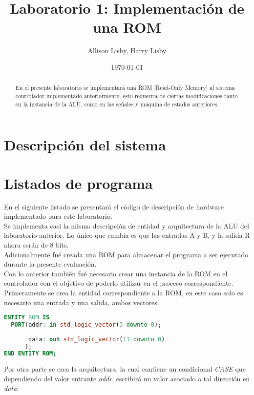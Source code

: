 \documentclass[12pt, letterpaper]{IEEEtran}
\title{Laboratorio 1: Implementación de una ROM}
\author{Allison Lisby, Harry Lisby}
\date{\today}
\begin{document}
\maketitle
\begin{abstract}
En el presente laboratorio se implementará una ROM [Read-Only Memory] al sistema controlador implementado anteriormente, esto requerirá de ciertas modificaciones tanto en la instancia de la ALU, como en las señales y máquina de estados anteriores.
\end{abstract}


\section{Descripción del sistema}

\section{Listados de programa} 
\indent En el siguiente listado se presentará el código de descripción de hardware implementado para este laboratorio.\\
\indent Se implementa casi la misma descripción de entidad y arquitectura de la ALU del laboratorio anterior. Lo único que cambia es que las entradas A y B, y la salida R ahora serán de 8 bits.\\
\indent Adicionalmente fué creada una ROM para almacenar el programa a ser ejecutado durante la presente evaluación. \\
\indent Con lo anterior también fué necesario crear una instancia de la ROM en el controlador con el objetivo de poderlo utilizar en el proceso correspondiente.\\
\indent Primeramente se crea la entidad correspondiente a la ROM, en este caso solo es necesario una entrada y una salida, ambos vectores.\\

\begin{lstlisting}[language=VHDL]
ENTITY ROM IS
  PORT(addr: in std_logic_vector(3 downto 0);
       
       data: out std_logic_vector(11 downto 0)
      );
END ENTITY ROM;
\end{lstlisting}

\indent Por otra parte se crea la arquitectura, la cual contiene un condicional \textit{CASE} que dependiendo del valor entrante \textit{addr}, escribirá un valor asociado a tal dirección en \textit{data}: \\
\end{document}
